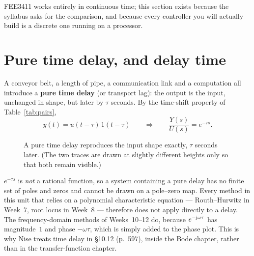 \documentclass[11pt,a4paper]{article}
\begin{document}
FEE3411 works entirely in continuous time; this section exists because the
syllabus asks for the comparison, and because every controller you will
actually build is a discrete one running on a processor.

\section{Pure time delay, and delay time}
\label{sec:delay}

A conveyor belt, a length of pipe, a communication link and a computation all
introduce a \textbf{pure time delay} (or transport lag): the output is the
input, unchanged in shape, but later by $\tau$ seconds. By the time-shift
property of Table~\ref{tab:pairs},
\[
  y(t) = u(t-\tau)\,1(t-\tau)
  \qquad\Longrightarrow\qquad
  \frac{Y(s)}{U(s)} = e^{-\tau s} .
\]

\begin{figure}[htbp]
\centering
{}
\caption{A pure time delay reproduces the input shape exactly, $\tau$ seconds
later. (The two traces are drawn at slightly different heights only so that
both remain visible.)}
\label{fig:delay}
\end{figure}

\begin{pitfall}
$e^{-\tau s}$ is \emph{not} a rational function, so a system containing a pure
delay has no finite set of poles and zeros and cannot be drawn on a pole--zero
map. Every method in this unit that relies on a polynomial characteristic
equation --- Routh--Hurwitz in Week~7, root locus in Week~8 --- therefore does
not apply directly to a delay. The frequency-domain methods of Weeks~10--12 do,
because $e^{-\mathrm{j}\omega\tau}$ has magnitude~$1$ and phase $-\omega\tau$, which is
simply added to the phase plot. This is why Nise treats time delay in
\S10.12 (p.~597), inside the Bode chapter, rather than in the transfer-function
chapter.
\end{pitfall}
\end{document}
